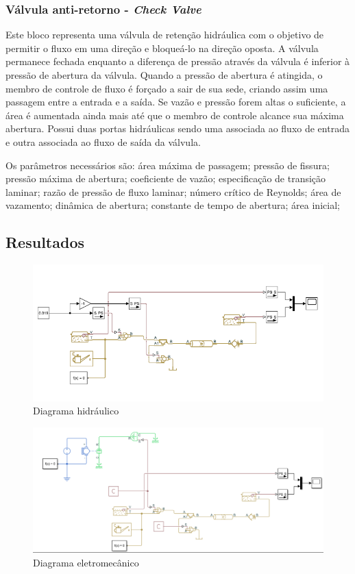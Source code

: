 	\subsubsection{ Válvula anti-retorno - \textit{Check Valve}}
	\par Este bloco representa uma válvula de retenção hidráulica com o objetivo de permitir o fluxo em uma direção e bloqueá-lo na direção oposta. A válvula permanece fechada enquanto a diferença de pressão através da válvula é inferior à pressão de abertura da válvula. Quando a pressão de abertura é atingida, o membro de controle de fluxo é forçado a sair de sua sede, criando assim uma passagem entre a entrada e a saída. Se vazão e pressão forem altas o suficiente, a área é aumentada ainda mais até que o membro de controle alcance sua máxima abertura. Possui duas portas hidráulicas sendo uma associada ao fluxo de entrada e outra associada ao fluxo de saída da válvula. 
	\par Os parâmetros necessários são: área máxima de passagem; pressão de fissura; pressão máxima de abertura; coeficiente de vazão; especificação de transição laminar; razão de pressão de fluxo laminar; número crítico de Reynolds; área de vazamento; dinâmica de abertura; constante de tempo de abertura; área inicial;

\subsection{Resultados}

\begin{figure}[H]
\centering
\includegraphics[width=1\textwidth]{figuras/diagrama_hidraulico.png}
\caption{Diagrama hidráulico}
\label{fig:metodologia}
\end{figure}

\begin{figure}[H]
\centering
\includegraphics[width=1\textwidth]{figuras/diagrama_mecanico.png}
\caption{Diagrama eletromecânico}
\label{fig:metodologia}
\end{figure}

